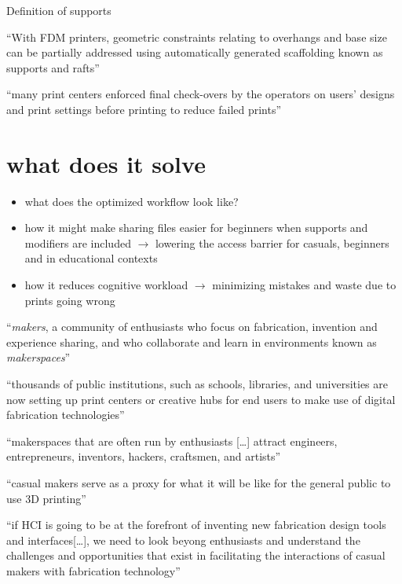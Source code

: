 Definition of supports 

``With FDM printers, geometric constraints relating to overhangs and base size can be partially addressed using automatically generated scaffolding known as supports and rafts''\cite[p.~391]{hudson_understanding_2016}

``many print centers enforced final check-overs by the operators on users’ designs and print settings before printing to reduce failed prints''\cite[p.~392]{hudson_understanding_2016}


\section{what does it solve}

\begin{itemize}
    \item what does the optimized workflow look like? 
    \item how it might make sharing files easier for beginners when supports and modifiers are included $\rightarrow$ lowering the access barrier for casuals, beginners and in educational contexts
    \item how it reduces cognitive workload $\rightarrow$ minimizing mistakes and waste due to prints going wrong 
\end{itemize}

``\emph{makers}, a community of enthusiasts who focus on fabrication, invention and experience sharing, and who collaborate and learn in environments known as \emph{makerspaces}''\cite{hudson_understanding_2016}

``thousands of public institutions, such as schools, libraries, and universities are now setting up print centers or creative hubs for end users to make use of digital fabrication technologies''\cite{hudson_understanding_2016}

``makerspaces that are often run by enthusiasts [\dots] attract engineers, entrepreneurs, inventors, hackers, craftsmen, and artists''\cite{hudson_understanding_2016}

``casual makers serve as a proxy for what it will be like for the general public to use 3D printing''\cite{hudson_understanding_2016}

``if HCI is going to be at the forefront of inventing new fabrication design tools and interfaces[\dots], we need to look beyong enthusiasts and understand the challenges and opportunities that exist in facilitating the interactions of casual makers with fabrication technology''\cite{hudson_understanding_2016}


